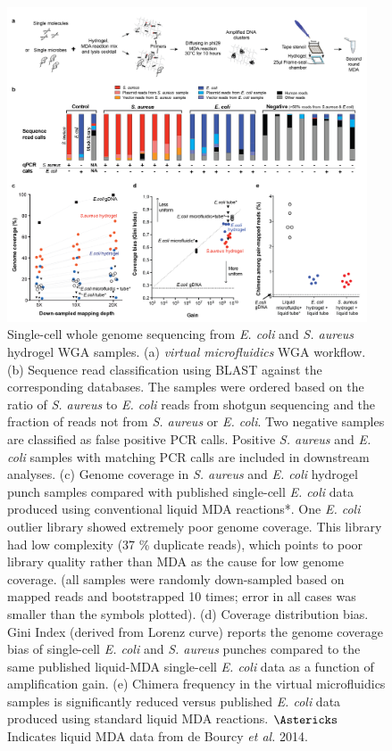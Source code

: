 \begin{figure}
\centering
\includegraphics[keepaspectratio,width=0.95\textwidth]{./figures/Thesis-16.png}
\caption[Single-cell whole genome sequencing from \textit{E. coli} and \textit{S. aureus} hydrogel WGA samples.]{Single-cell whole genome sequencing from \textit{E. coli} and \textit{S. aureus} hydrogel WGA samples. (a) \textit{virtual microfluidics} WGA workflow. (b) Sequence read classification using BLAST against the corresponding databases. The samples were ordered based on the ratio of \textit{S. aureus}  to \textit{E. coli}  reads from shotgun sequencing and the fraction of reads not from \textit{S. aureus}  or \textit{E. coli}. Two negative samples are classified as false positive PCR calls. Positive \textit{S. aureus}  and \textit{E. coli}  samples with matching PCR calls are included in downstream analyses. (c) Genome coverage in \textit{S. aureus}  and \textit{E. coli}  hydrogel punch samples compared with published single-cell \textit{E. coli} data produced using conventional liquid MDA reactions*. One \textit{E. coli}  outlier library showed extremely poor genome coverage. This library had low complexity (37 \% duplicate reads), which points to poor library quality rather than MDA as the cause for low genome coverage. (all samples were randomly down-sampled based on mapped reads and bootstrapped 10 times; error in all cases was smaller than the symbols plotted). (d) Coverage distribution bias. Gini Index (derived from Lorenz curve) reports the genome coverage bias of single-cell \textit{E. coli}  and \textit{S. aureus}  punches compared to the same published liquid-MDA single-cell \textit{E. coli}  data as a function of amplification gain. (e) Chimera frequency in the virtual microfluidics samples is significantly reduced versus published \textit{E. coli}  data produced using standard liquid MDA reactions. $\Astericks$ Indicates liquid MDA data from de Bourcy \textit{et al.} 2014.}
\label{fig:ESMDA}
\end{figure}

